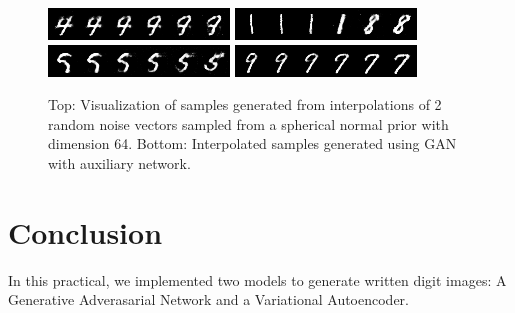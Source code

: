 \documentclass[11pt]{article}
\begin{document}
\begin{figure}[H]
	\begin{center}
		\includegraphics[scale=0.5]{interp_fake_images-1}
		\includegraphics[scale=0.5]{interp_fake_images-2} \\
		\includegraphics[scale=0.5]{interp_fake_images-1-mod}
		\includegraphics[scale=0.5]{interp_fake_images-2-mod}
		\label{fig:gan-vis}
		\caption{Top: Visualization of samples generated from interpolations of 2 random noise vectors sampled from a spherical normal prior with dimension 64. Bottom: Interpolated samples generated using GAN with auxiliary network.}
	\end{center} 
\end{figure}

\section{Conclusion}
In this practical, we implemented two models to generate written digit images: A Generative Adverasarial Network and a Variational Autoencoder.



\nocite{*}

\end{document}
